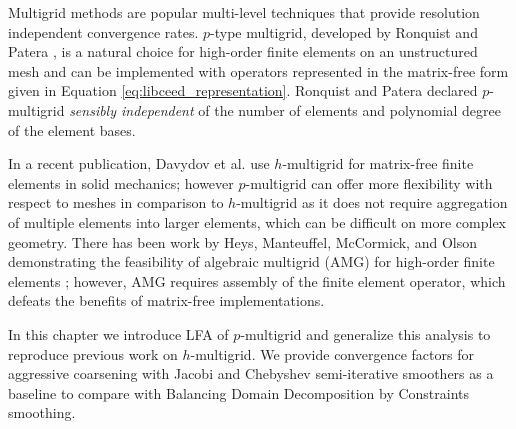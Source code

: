 Multigrid methods are popular multi-level techniques that provide resolution independent convergence rates.
$p$-type multigrid, developed by Ronquist and Patera \cite{ronquist1987spectral}, is a natural choice for high-order finite elements on an unstructured mesh and can be implemented with operators represented in the matrix-free form given in Equation \ref{eq:libceed_representation}.
Ronquist and Patera declared $p$-multigrid \textit{sensibly independent} of the number of elements and polynomial degree of the element bases.

In a recent publication, Davydov \cite{davydov2019matrix} et al. use $h$-multigrid for matrix-free finite elements in solid mechanics; however $p$-multigrid can offer more flexibility with respect to meshes in comparison to $h$-multigrid as it does not require aggregation of multiple elements into larger elements, which can be difficult on more complex geometry.
There has been work by Heys, Manteuffel, McCormick, and Olson demonstrating the feasibility of algebraic multigrid (AMG) for high-order finite elements \cite{heys2005algebraic}; however, AMG requires assembly of the finite element operator, which defeats the benefits of matrix-free implementations.

In this chapter we introduce LFA of $p$-multigrid and generalize this analysis to reproduce previous work on $h$-multigrid.
We provide convergence factors for aggressive coarsening with Jacobi and Chebyshev semi-iterative smoothers as a baseline to compare with Balancing Domain Decomposition by Constraints smoothing.